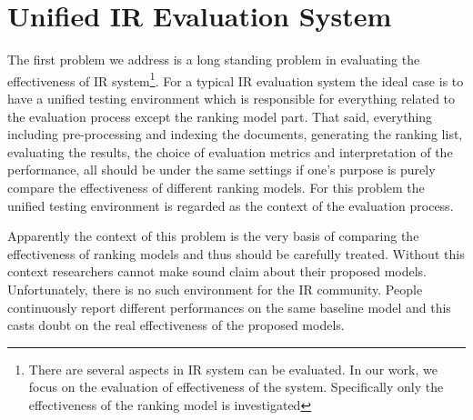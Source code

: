\section{Unified IR Evaluation System}
The first problem we address is a long standing problem in evaluating the 
effectiveness of IR system\footnote{There are several aspects in IR system 
can be evaluated. In our work, we focus on the evaluation of effectiveness 
of the system. Specifically only the effectiveness of the ranking model is 
investigated}. 
For a typical IR evaluation system the ideal case is to have a unified 
testing environment which is responsible for everything related 
to the evaluation process except the ranking model part. That said, everything 
including pre-processing and indexing the documents, generating the ranking 
list, evaluating the results, the choice of evaluation metrics and 
interpretation of the performance, all should be under the same settings 
if one's purpose is purely compare the effectiveness of different ranking models.
For this problem the unified testing environment is regarded as the context of 
the evaluation process. 

Apparently the context of this problem is the very basis of comparing the 
effectiveness of ranking models and thus should be carefully treated. 
Without this context researchers cannot make sound claim about 
their proposed models. Unfortunately, there is no such environment for the 
IR community. People continuously report different performances on the same 
baseline model \cite{Yang:2016:RSI:2970398.2970415} and this casts doubt on 
the real effectiveness of the proposed models.

